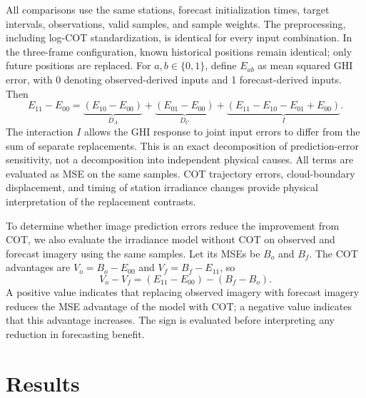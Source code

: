 \documentclass[11pt]{article}
\begin{document}
All comparisons use the same stations, forecast initialization times, target intervals, observations, valid samples, and sample weights. The preprocessing, including log-COT standardization, is identical for every input combination. In the three-frame configuration, known historical positions remain identical; only future positions are replaced. For $a,b\in\{0,1\}$, define $E_{ab}$ as mean squared GHI error, with 0 denoting observed-derived inputs and 1 forecast-derived inputs. Then
\begin{equation}
E_{11}-E_{00}=\underbrace{(E_{10}-E_{00})}_{D_A}
+\underbrace{(E_{01}-E_{00})}_{D_C}
+\underbrace{(E_{11}-E_{10}-E_{01}+E_{00})}_{I}.
\label{eq:propagation}
\end{equation}
The interaction $I$ allows the GHI response to joint input errors to differ from the sum of separate replacements. This is an exact decomposition of prediction-error sensitivity, not a decomposition into independent physical causes. All terms are evaluated as MSE on the same samples. COT trajectory errors, cloud-boundary displacement, and timing of station irradiance changes provide physical interpretation of the replacement contrasts.

To determine whether image prediction errors reduce the improvement from COT, we also evaluate the irradiance model without COT on observed and forecast imagery using the same samples. Let its MSEs be $B_o$ and $B_f$. The COT advantages are $V_o=B_o-E_{00}$ and $V_f=B_f-E_{11}$, so
\begin{equation}
V_o-V_f=(E_{11}-E_{00})-(B_f-B_o).
\label{eq:value-loss}
\end{equation}
A positive value indicates that replacing observed imagery with forecast imagery reduces the MSE advantage of the model with COT; a negative value indicates that this advantage increases. The sign is evaluated before interpreting any reduction in forecasting benefit.

\FloatBarrier
\section{Results}
\end{document}
